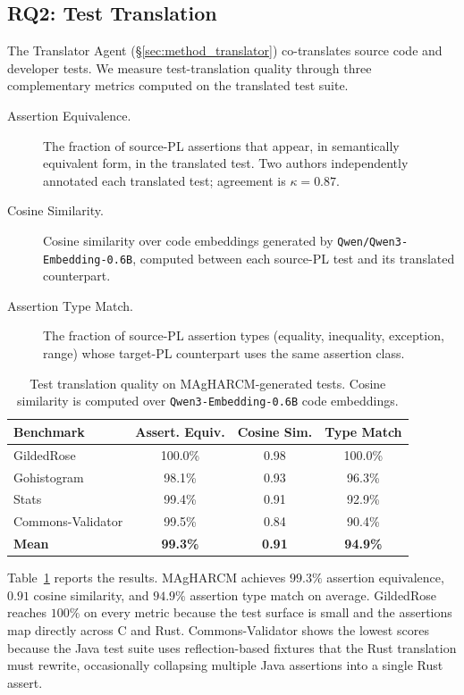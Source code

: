 \subsection{RQ2: Test Translation}
\label{sec:eval_rq2}

The Translator Agent (§\ref{sec:method_translator}) co-translates
source code and developer tests. We measure test-translation quality
through three complementary metrics computed on the translated test
suite.

\begin{description}
    \item[Assertion Equivalence.] The fraction of source-PL assertions
    that appear, in semantically equivalent form, in the translated
    test. Two authors independently annotated each translated test;
    agreement is $\kappa = 0.87$.
    \item[Cosine Similarity.] Cosine similarity over code embeddings
    generated by \texttt{Qwen/Qwen3-Embedding-0.6B}, computed between
    each source-PL test and its translated counterpart.
    \item[Assertion Type Match.] The fraction of source-PL
    assertion types (equality, inequality, exception, range) whose
    target-PL counterpart uses the same assertion class.
\end{description}

\begin{table}[!t]
\centering
\small
\begin{tabular}{lccc}
\toprule
\textbf{Benchmark} & \textbf{Assert. Equiv.} & \textbf{Cosine Sim.} & \textbf{Type Match} \\
\midrule
GildedRose & 100.0\% & 0.98 & 100.0\% \\
Gohistogram & 98.1\% & 0.93 & 96.3\% \\
Stats & 99.4\% & 0.91 & 92.9\% \\
Commons-Validator & 99.5\% & 0.84 & 90.4\% \\
\midrule
\textbf{Mean} & \textbf{99.3\%} & \textbf{0.91} & \textbf{94.9\%} \\
\bottomrule
\end{tabular}
\vspace{0.3em}
\caption{Test translation quality on MAgHARCM-generated tests. Cosine
similarity is computed over \texttt{Qwen3-Embedding-0.6B} code
embeddings.}
\label{tab:test_translation}
\end{table}

Table~\ref{tab:test_translation} reports the results. MAgHARCM
achieves $99.3\%$ assertion equivalence, $0.91$ cosine similarity,
and $94.9\%$ assertion type match on average. GildedRose reaches
$100\%$ on every metric because the test surface is small and the
assertions map directly across C and Rust. Commons-Validator shows
the lowest scores because the Java test suite uses reflection-based
fixtures that the Rust translation must rewrite, occasionally
collapsing multiple Java assertions into a single Rust assert.

